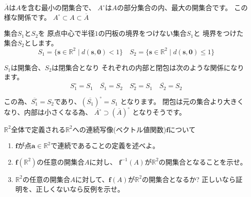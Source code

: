 \documentclass[10pt,b5paper]{ltjsarticle}
\begin{document}
$\overline{A}$は$A$を含む最小の閉集合で、
$A^\circ$は$A$の部分集合の内、最大の開集合です。
この様な関係です。
$A^\circ \subset A \subset \overline{A}$

集合$S_1$と$S_2$を
原点中心で半径$1$の円板の境界をつけない集合$S_1$と
境界をつけた集合$S_2$とします。
\begin{equation}
 S_1 = \{ \bm{s}\in \mathbb{R}^2 \mid d(\bm{s},\bm{0})<1 \}
  \quad
  S_2 = \{ \bm{s}\in \mathbb{R}^2 \mid d(\bm{s},\bm{0}) \leq 1 \}
\end{equation}

$S_1$は開集合、$S_2$は閉集合となり
それぞれの内部と閉包は次のような関係になります。
\begin{equation}
  S_1^\circ = S_1
  \quad
  \overline{S_1} =S_2
  \quad
  S_2^\circ = S_1
  \quad
  \overline{S_2}=S_2
\end{equation}

この為、$\overline{S_1^\circ}=S_2$であり、$(\overline{S_1})^\circ = S_1$
となります。
閉包は元の集合より大きくなり、内部は小さくなる為、
$\overline{A^\circ} \supset (\overline{A})^\circ$
となりそうです。





\newpage



 $\mathbb{R}^2$全体で定義される$\mathbb{R}^2$への連続写像(ベクトル値関数)$\bm{f}$について
\begin{enumerate}
 \item $\bm{f}$が点$\bm{a}\in\mathbb{R}^2$で連続であることの定義を述べよ。
 \item $\bm{f}(\mathbb{R}^2)$の任意の開集合$A$に対し、
       $\bm{f}^{-1}(A)$が$\mathbb{R}^2$の開集合となることを示せ。
 \item $\mathbb{R}^2$の任意の開集合$A$に対して、$\bm{f}(A)$が$\mathbb{R}^2$の開集合となるか?
       正しいなら証明を、正しくないなら反例を示せ。
\end{enumerate}
\end{document}
